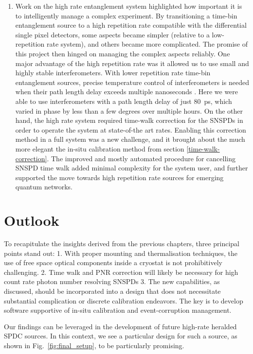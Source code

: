 \documentclass[11pt]{caltech_thesis} %
\begin{document}
\begin{enumerate}
\item
  Work on the high rate entanglement system highlighted how important it is to intelligently manage a complex experiment. By transitioning a time-bin entanglement source to a high repetition rate compatible with the differential single pixel detectors, some aspects became simpler (relative to a low-repetition rate system), and others became more complicated. The promise of this project then hinged on managing the complex aspects reliably. One major advantage of the high repetition rate was it allowed us to use small and highly stable interferometers. With lower repetition rate time-bin entanglement sources, precise temperature control of interferometers is needed when their path length delay exceeds multiple nanoseconds \autocite{Valivarthi2020}. Here we were able to use interferometers with a path length delay of just 80~ps, which varied in phase by less than a few degrees over multiple hours. On the other hand, the high rate system required time-walk correction for the SNSPDs in order to operate the system at state-of-the art rates. Enabling this correction method in a full system was a new challenge, and it brought about the much more elegant the in-situ calibration method from section \ref{time-walk-correction}. The improved and mostly automated procedure for cancelling SNSPD time walk added minimal complexity for the system user, and further supported the move towards high repetition rate sources for emerging quantum networks.
\end{enumerate}

\hypertarget{outlook}{%
\section{Outlook}\label{outlook}}

To recapitulate the insights derived from the previous chapters, three principal points stand out:
1. With proper mounting and thermalisation techniques, the use of free space optical components inside a cryostat is not prohibitively challenging.
2. Time walk and PNR correction will likely be necessary for high count rate photon number resolving SNSPDs
3. The new capabilities, as discussed, should be incorporated into a design that does not necessitate substantial complication or discrete calibration endeavors. The key is to develop software supportive of in-situ calibration and event-corruption management.

Our findings can be leveraged in the development of future high-rate heralded SPDC sources. In this context, we see a particular design for such a source, as shown in Fig.~\ref{fig:final_setup}, to be particularly promising.
\end{document}
